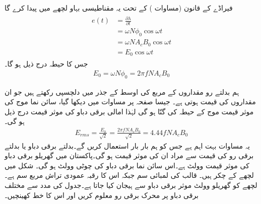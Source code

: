 فیراڈے کے قانون  (مساوات )  کے تحت یہ مقناطیسی بہاو  لچھے میں    پیدا کرے گا
\begin{gather}
\begin{aligned}
e(t)&=\frac{\partial \lambda}{\partial t}\\
&=\omega N \phi_0 \cos \omega t \\
&=\omega N A_c B_0 \cos \omega t\\
&=E_0 \cos \omega t
\end{aligned}
\end{gather}
جس کا حیطہ درج ذیل ہو گا۔
\begin{align}
E_0=\omega N \phi_0=2 \pi f N A_c B_0
\end{align}

ہم بدلتے رو مقداروں کے مربع کی اوسط کے جذر  میں دلچسپی رکھتے ہیں جو ان مقداروں کی  قیمت ہوتی ہے۔ جیسا صفحہ  پر مساوات   میں دیکھا گیا،  سائن نما  موج کی موثر قیمت موج کے حیطہ کی   گنّا ہو گی  لہٰذا امالی برقی دباو کی موثر قیمت  درج ذیل ہو گی۔
\begin{align}\label{مساوات_مقناطیسی_دور_پیدا_دباو_موثر_قیمت}
E_{rms}=\frac{E_0}{\sqrt{2}}=\frac{2 \pi f N A_c B_0}{\sqrt{2}}=4.44 f N A_c B_0
\end{align}
یہ مساوات بہت اہم ہے  جس کو ہم بار بار استعمال کریں گے۔بدلتے برقی دباو یا بدلتے برقی رو کی قیمت سے مراد ان کی موثر  قیمت ہو گی۔پاکستان میں گھریلو برقی دباو کی موثر قیمت  وولٹ ہے۔اس سائن نما برقی دباو کی چوٹی  وولٹ ہو گی۔
%
شکل  میں لچھے کے  چکر ہیں۔ قالب کی لمبائی  سم جبکہ اس کا رقبہ عمودی تراش  مربع سم ہے۔لچھے  کو گھریلو  وولٹ موثر برقی دباو سے ہیجان  کیا جاتا ہے۔جدول  کی مدد سے مختلف برقی دباو پر محرک برقی رو معلوم کریں اور اس کا خط کھینچیں۔

